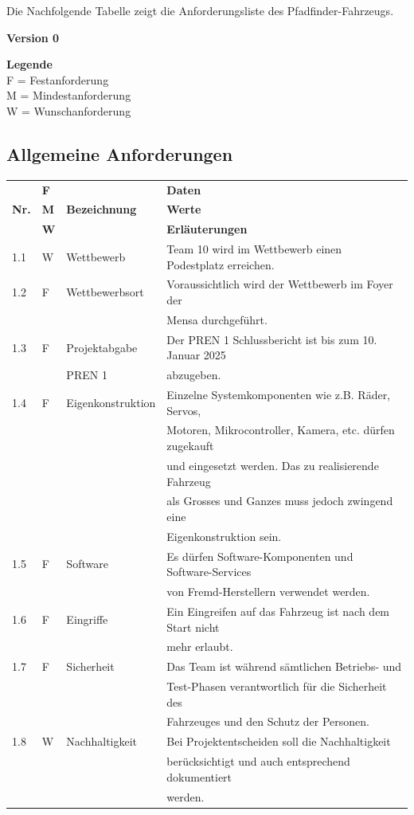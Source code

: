 \documentclass[../main.tex]{subfiles}
\begin{document}
Die Nachfolgende Tabelle zeigt die Anforderungsliste des Pfadfinder-Fahrzeugs.

\textbf{Version 0}

\textbf{Legende} \\ F = Festanforderung \\ M = Mindestanforderung \\ W = Wunschanforderung

\subsection{Allgemeine Anforderungen}
\begin{tabular}{|l|l|l|l|}
  \hline
  & \textbf{F} & & \textbf{Daten} \\
  \textbf{Nr.} & \textbf{M} & \textbf{Bezeichnung} & \textbf{Werte} \\
  & \textbf{W} & & \textbf{Erläuterungen} \\
  \hline
  1.1 & W & Wettbewerb & Team 10 wird im Wettbewerb einen Podestplatz
  erreichen. \\
  \hline
  1.2 & F & Wettbewerbsort & Voraussichtlich wird der Wettbewerb im
  Foyer der \\
  & & & Mensa durchgeführt. \\
  \hline
  1.3 & F & Projektabgabe & Der PREN 1 Schlussbericht ist bis zum 10.
  Januar 2025 \\
  & & PREN 1 & abzugeben. \\
  \hline
  1.4 & F & Eigenkonstruktion & Einzelne Systemkomponenten wie z.B.
  Räder, Servos, \\
  & & & Motoren, Mikrocontroller, Kamera, etc. dürfen zugekauft \\
  & & & und eingesetzt werden. Das zu realisierende Fahrzeug \\
  & & & als Grosses und Ganzes muss jedoch zwingend eine \\
  & & & Eigenkonstruktion sein. \\
  \hline
  1.5 & F & Software & Es dürfen Software-Komponenten und Software-Services \\
  & & & von Fremd-Herstellern verwendet werden. \\
  \hline
  1.6 & F & Eingriffe & Ein Eingreifen auf das Fahrzeug ist nach dem
  Start nicht \\
  & & & mehr erlaubt. \\
  \hline
  1.7 & F & Sicherheit & Das Team ist während sämtlichen Betriebs- und \\
  & & & Test-Phasen verantwortlich für die Sicherheit des \\
  & & & Fahrzeuges und den Schutz der Personen. \\
  \hline
  1.8 & W & Nachhaltigkeit & Bei Projektentscheiden soll die Nachhaltigkeit \\
  & & & berücksichtigt und auch entsprechend dokumentiert \\
  & & & werden. \\
  \hline
\end{tabular}
\end{document}
